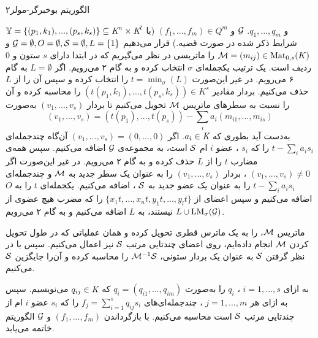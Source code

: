 \begin{proposition}
\renewcommand{\algorithmicrequire}{\textbf{ورودی}}
\renewcommand{\algorithmicensure}{\textbf{خروجی}}
\begin{algorithm}[h]
	\caption{الگوریتم بوخبرگر-مولر۲}
	\label{buchberger moller2}
	\begin{algorithmic}[1]				
		\REQUIRE $\mathbb{Y} = \{(p_{1},k_{1}),...,(p_{s},k_{s})\}\subseteq \textit{K}^{n}\times \textit{K}^{l}$
		و
		$q_{1},...,q_{m}$.
		\ENSURE ${\mathcal G}$
		و
		$(f_{1},...,f_{m})\in Q^{m}$
		{\footnotesize (با شرایط ذکر شده در صورت قضیه.) }
		\STATE قرار می‌دهیم 
		${\mathcal G} = \emptyset, O = \emptyset, {\mathcal S} = \emptyset, L = \{1\}$
		و 
		${\mathcal M} = (m_{ij})\in \operatorname{\mathrm{Mat}}_{0,s}(K)$
		را ماتریسی در نظر می‌گیریم که در ابتدا دارای 
		$s$
		ستون و 
		$0$
		ردیف است. یک ترتیب یکجمله‌ای  
		$\sigma$
		انتخاب کرده  و به گام ۲ می‌رویم. 
		\STATE اگر 
		$L = \emptyset$
		به گام ۶ می‌رویم. در غیر این‌صورت 
		$t = \min_{\sigma}(L)$
		را انتخاب کرده و سپس آن را از 
		$L$
		حذف می‌کنیم. 
		\STATE بردار  مقادیر
		$(t(p_{1},k_{1}),...,t(p_{s},k_{s}))\in K^{s}$
		را محاسبه کرده و آن را نسبت به سطرهای ماتریس 
		${\mathcal M}$
		تحویل می‌کنیم تا بردار 
		$(v_{1},...,v_{s})$
		به‌صورت 
		$$(v_{1},...,v_{s}) = (t(p_{1}),...,t(p_{s}))  - \sum_{i}a_{i}(m_{i1},...,m_{is})$$
		به‌دست آید بطوری که 
		$a_{i}\in \textit{K}$.
		\STATE اگر 
		$(v_{1},...,v_{s}) = (0,...,0)$
		آن‌گاه چندجمله‌ای 
		$t - \sum_{i}a_{i}s_{i}$
		را که 
		$s_{i}$
		، 
		عضو 
		$i$
ام
		${\mathcal S}$
		است، به مجموعه‌ی 
		${\mathcal G}$
		اضافه می‌کنیم. سپس همه‌ی مضارب 
		$t$
		را از 
		$L$
		حذف کرده و به گام ۲ می‌رویم.
		\STATE در غیر این‌صورت اگر  
		$(v_{1},...,v_{s}) \neq 0$
		، بردار 
		$(v_{1},...,v_{s})$
		را به عنوان یک سطر جدید به 
		${\mathcal M}$
		و چندجمله‌ای 
		$t - \sum_{i}a_{i}s_{i}$
		را به عنوان یک عضو جدید به 
		${\mathcal S}$
		، اضافه می‌کنیم. یکجمله‌ای 
		$t$
		را به 
		$O$
		اضافه می‌کنیم و سپس  اعضای از 
		$\{x_{1}t,...,x_{n}t,y_{1}t,...,y_{l}t\}$
		را که مضرب هیچ عضوی از 
		$L\cup \operatorname{\mathrm{LM}}_{\sigma}({\mathcal G})$
		نیستند، به 
		$L$
		اضافه می‌کنیم و به گام ۲ می‌رویم. 
		\item 
		ماتریس 
		${\mathcal M}$،
		را به یک ماترس قطری تحویل کرده و همان عملیاتی که در طول تحویل کردن 
		${\mathcal M}$
		انجام داده‌ایم، روی اعضای چندتایی مرتب 
		${\mathcal S}$
		نیز اعمال می‌کنیم. سپس با در نظر گرفتن 
		${\mathcal S}$
		به عنوان یک بردار ستونی، 
		${\mathcal M}^{-1}{\mathcal S}$
		را محاسبه کرده و آن‌را جایگزین 
		${\mathcal S}$
		می‌کنیم. 
		\item 
		به ازای 
		$i =1,...,s$
		، 
		$q_{i}$
		را به‌صورت 
		$q_{i} = (q_{i1},...,q_{im})$
		که 
		$q_{ij}\in\textit{K}$
		می‌نویسیم. سپس به ازای هر 
		$j = 1,...,m$
		، چندجمله‌ای‌های 
		$f_{j} = \sum_{i  =1}^{s}q_{ij}s_{i}$
		را که 
		$s_{i}$
		عضو 
		$i$
		ام از چندتایی مرتب 
		${\mathcal S}$
		است محاسبه می‌کنیم. با بازگرداندن 
		$(f_{1},...,f_{m})$
		و
		${\mathcal G}$
الگوریتم خاتمه می‌یابد. 
	\end{algorithmic}
\end{algorithm}
\end{proposition}
